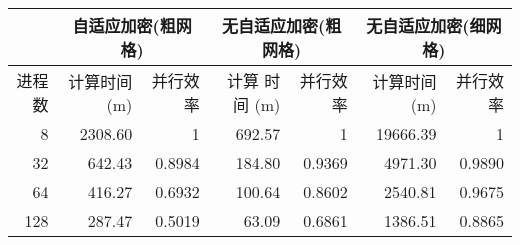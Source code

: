 
\begin{center}
\begin{tabular}{r|rr|rr|rr}
   & \multicolumn{2}{c}{自适应加密(粗网格)} & \multicolumn{2}{c}{
     无自适应加密(粗网格)} &  \multicolumn{2}{c}{无自适应加密(细网格)}      \\
\hline
 进程数  &        计算时间 (m)  &  并行效率  &              计算
 时间 (m)  &  并行效率  &              计算时间 (m)  &  并行效率  \\
\hline
      8  &             2308.60  &         1  &                692.57  &         1  &              19666.39  &         1  \\
     32  &              642.43  &    0.8984  &                184.80  &    0.9369  &               4971.30  &    0.9890  \\
     64  &              416.27  &    0.6932  &                100.64  &    0.8602  &               2540.81  &    0.9675  \\
    128  &              287.47  &    0.5019  &                 63.09  &    0.6861  &               1386.51  &    0.8865  \\
\hline
\end{tabular}
\end{center}
